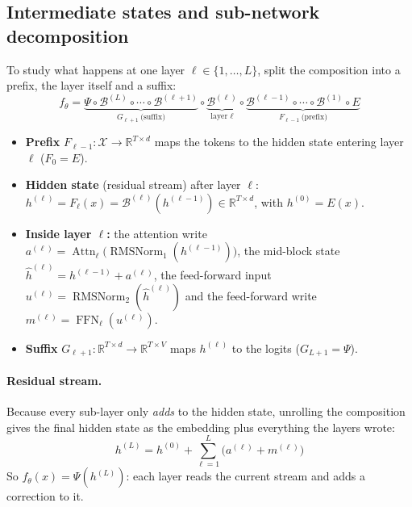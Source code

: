 \documentclass[10pt,a4paper]{article}
\newcommand{\op}[1]{\operatorname{#1}}
\theoremstyle{definition}
\begin{document}
\subsection{Intermediate states and sub-network decomposition}
To study what happens at one layer $\ell\in\{1,\dots,L\}$, split the composition into a prefix, the layer itself and a suffix:
\begin{equation}
  f_\theta = \underbrace{\Psi\circ\mathcal{B}^{(L)}\circ\cdots\circ\mathcal{B}^{(\ell+1)}}_{G_{\ell+1}\ \text{(suffix)}}\circ\underbrace{\mathcal{B}^{(\ell)}}_{\text{layer }\ell}\circ\underbrace{\mathcal{B}^{(\ell-1)}\circ\cdots\circ\mathcal{B}^{(1)}\circ E}_{F_{\ell-1}\ \text{(prefix)}}
\end{equation}
\begin{itemize}
\item \textbf{Prefix} $F_{\ell-1}:\mathcal{X}\to\mathbb{R}^{T\times d}$ maps the tokens to the hidden state entering layer $\ell$ ($F_0=E$).
\item \textbf{Hidden state} (residual stream) after layer $\ell$: $h^{(\ell)}=F_\ell(x)=\mathcal{B}^{(\ell)}(h^{(\ell-1)})\in\mathbb{R}^{T\times d}$, with $h^{(0)}=E(x)$.
\item \textbf{Inside layer $\ell$:} the attention write $a^{(\ell)}=\op{Attn}_\ell\big(\op{RMSNorm}_{1}(h^{(\ell-1)})\big)$, the mid-block state $\hat h^{(\ell)}=h^{(\ell-1)}+a^{(\ell)}$, the feed-forward input $u^{(\ell)}=\op{RMSNorm}_{2}(\hat h^{(\ell)})$ and the feed-forward write $m^{(\ell)}=\op{FFN}_\ell(u^{(\ell)})$.
\item \textbf{Suffix} $G_{\ell+1}:\mathbb{R}^{T\times d}\to\mathbb{R}^{T\times V}$ maps $h^{(\ell)}$ to the logits ($G_{L+1}=\Psi$).
\end{itemize}
\paragraph{Residual stream.} Because every sub-layer only \emph{adds} to the hidden state, unrolling the composition gives the final hidden state as the embedding plus everything the layers wrote:
\begin{equation}
  h^{(L)} = h^{(0)} + \sum_{\ell=1}^{L}\big(a^{(\ell)}+m^{(\ell)}\big)
\end{equation}
So $f_\theta(x)=\Psi(h^{(L)})$: each layer reads the current stream and adds a correction to it.
\end{document}
